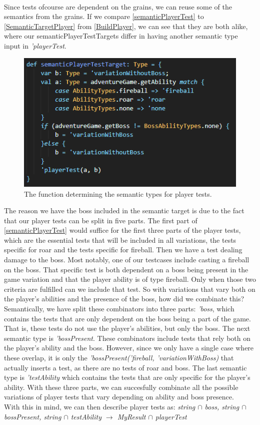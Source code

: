 \\
Since tests ofcourse are dependent on the grains, we can reuse some of the semantics from the grains. If we compare \autoref{semanticPlayerTest} to \autoref{SemanticTargetPlayer} from \autoref{BuildPlayer}, we can see that they are both alike, where our semanticPlayerTestTargets differ in having another semantic type input in \textit{'playerTest}. 
\begin{figure}[h]
    \centering
    \includegraphics[width=0.7\linewidth]{Materials/TestingDiscussion/SemanticPlayerTestTarget}
    \caption{The function determining the semantic types for player tests.}
    \label{semanticPlayerTest}
\end{figure}
The reason we have the boss included in the semantic target is due to the fact that our player tests can be split in five parts. The first part of \autoref{semanticPlayerTest} would suffice for the first three parts of the player tests, which are the essential tests that will be included in all variations, the tests specific for roar and the tests specific for fireball. Then we have a test dealing damage to the boss. Most notably, one of our testcases include casting a fireball on the boss. That specific test is both dependent on a boss being present in the game variation and that the player ability is of type fireball. Only when those two criteria are fulfilled can we include that test. So with variations that vary both on the player's abilities and the presence of the boss, how did we combinate this? \\
Semantically, we have split these combinators into three parts: \textit{'boss}, which contains the tests that are only dependent on the boss being a part of the game. That is, these tests do not use the player's abilities, but only the boss. The next semantic type is \textit{'bossPresent}. These combinators include tests that rely both on the player's ability and the boss. However, since we only have a single case where these overlap, it is only the \textit{'bossPresent('fireball, 'variationWithBoss)} that actually inserts a test, as there are no tests of roar and boss. The last semantic type is \textit{'testAbility} which contains the tests that are only specific for the player's ability. With these three parts, we can succesfully combinate all the possible variations of player tests that vary depending on ability and boss presence. 
\\ 
With this in mind, we can then describe player tests as: \textit{string $\cap$ boss, string $\cap$ bossPresent, string $\cap$ testAbility $\to$ MyResult $\cap$ playerTest}

